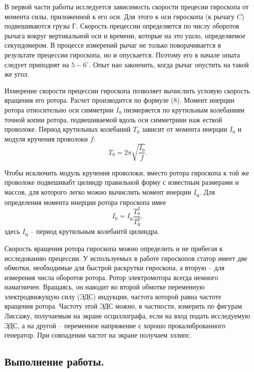 \documentclass[a4paper,12pt]{article}
\begin{document}
В первой части работы исследуется зависимость скорости прецесии гироскопа от момента силы, приложенной к его оси. Для этого к оси гироскопа (к рычагу $C$) подвешиваются грузы $\text{Г}$. Скорость прецессии определяется по числу оборотов рычага вокруг вертикальной оси и времени, которые на это ушло, определяемое секундомером. В процессе измерений рычаг не только поворачивается в результате прецессии гироскопа, но и опускается. Поэтому его в начале опыта следует приподнят на $5-6^{\circ}$. Опыт нао закончить, когда рычаг опустить на такой же угол.

Ихмерение скорости прецессии гироскопа позволяет вычислить угловую скорость вращения его ротора. Расчет производится по формуле (8). Момент инерции ротора относительно оси симметрии $I_0$ пизмеряется по крутильным колебаниям точной копии ротора, подвешиваемой вдоль оси симметриии наж есткой проволоке. Период крутильных колебаний $T_0$ зависит от момента инерции $I_0$ и модуля кручения проволоки $f$:
\[T_0 = 2\pi \sqrt{\frac{I_0}{f}}. \]

Чтобы исключить модуль кручения проволоки, вместо ротора гироскопа к той же проволоке подвешивабт цилиндр правильной форму с известным размерами и массов, для которого легко можно вычислить момент инерции $I_{\text{ц}}$. Для определения момента инерции ротора гироскопа имее \[ I_0 = I_{\text{ц}}\frac{T_0^2}{T_{\text{ц}}^2}, \]
здесь $I_{\text{ц}}$ -- период крутильным колебантй цилиндра.

Скорость вращения ротора гироскопа можно определить и не прибегая к исследованию прецессии. У используемых в работе гироскопов статор имеет две обмотки, необходимые для быстрой раскрутки гироскопа, а вторую -- для измерения числа оборотов ротора. Ротор электромотора всегда немного намагничен. Вращаясь, он наводит во второй обмотке переменную электродвижущую силу (ЭДС) индукции, частота которой равна частоте вращения ротора. Частоту этой ЭДС можно, в частности, измерить по фигурам Лиссажу, получаемым на экране осциллографа, если на вход подать исследуемую ЭДС, а на другой -- переменное напряжение с хорошо прокалиброванного генератор. При совпадении частот на экране получаем эллипс.



\begin{center}
\section{Выполнение работы.}
\end{center}
\end{document}
